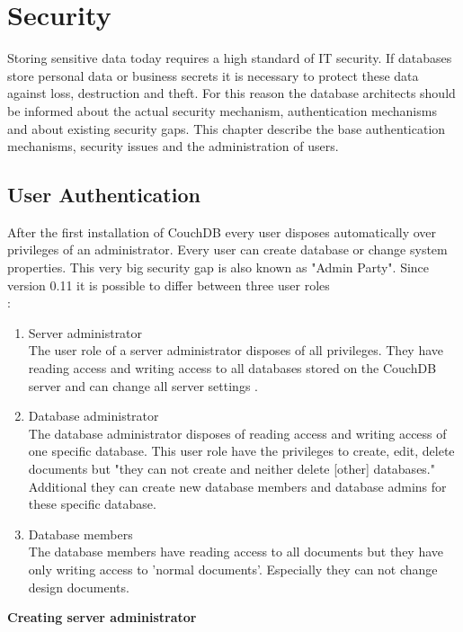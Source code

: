 \section{Security}

Storing sensitive data today requires a high standard of IT security. If databases store personal data or business secrets it is necessary to protect these data against loss, destruction and theft. For this reason the  database architects  should be informed about the actual security mechanism, authentication mechanisms and about existing security gaps. This chapter describe the base authentication mechanisms, security issues and the administration of users.

\subsection{User Authentication}
After the first installation of CouchDB every user disposes automatically over privileges of an administrator. Every user can create database or change system properties. This very big security gap is also known as "Admin Party". Since version 0.11 it is possible to differ between three user roles \\ \parencite{ApacheSoftwareFoundation.2013.SecurityFeatures}:
\begin{enumerate}
\item Server administrator \\
The user role of a server administrator disposes of all privileges. They have reading access and writing access to all databases stored on the CouchDB server and can change all server settings \parencite{Anderson.2010.Buch}.
\item Database administrator \\
The database administrator disposes of reading access and writing access of one specific database. This user role have the privileges to create, edit, delete documents but "they can not create and neither delete [other] databases." \parencite{ApacheSoftwareFoundation.2013.SecurityFeatures}
Additional they can create new database members and database admins for these specific database.
\item Database members \\
The database members have reading access to all documents but they have only writing access to 'normal documents'. Especially they can not change design documents.
\end{enumerate}
\textbf{Creating server administrator}\\
